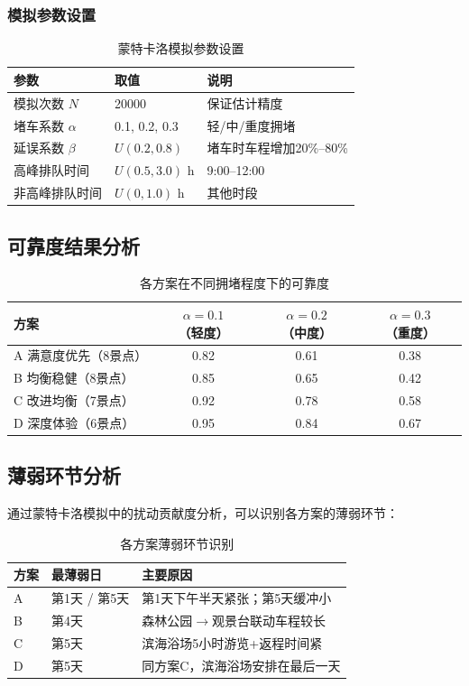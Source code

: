 \documentclass[12pt,a4paper]{ctexart}
\begin{document}
\subsubsection{模拟参数设置}

\begin{table}[H]
\centering
\caption{蒙特卡洛模拟参数设置}
\label{tab:mc_params}
\begin{tabular}{lll}
\toprule
\textbf{参数} & \textbf{取值} & \textbf{说明} \\
\midrule
模拟次数 $N$ & 20000 & 保证估计精度 \\
堵车系数 $\alpha$ & 0.1, 0.2, 0.3 & 轻/中/重度拥堵 \\
延误系数 $\beta$ & $U(0.2, 0.8)$ & 堵车时车程增加20\%--80\% \\
高峰排队时间 & $U(0.5, 3.0)$ h & 9:00--12:00 \\
非高峰排队时间 & $U(0, 1.0)$ h & 其他时段 \\
\bottomrule
\end{tabular}
\end{table}

\subsection{可靠度结果分析}

\begin{table}[H]
\centering
\caption{各方案在不同拥堵程度下的可靠度}
\label{tab:reliability}
\begin{tabular}{lccc}
\toprule
\textbf{方案} & \textbf{$\alpha=0.1$（轻度）} & \textbf{$\alpha=0.2$（中度）} & \textbf{$\alpha=0.3$（重度）} \\
\midrule
A 满意度优先（8景点） & 0.82 & 0.61 & 0.38 \\
B 均衡稳健（8景点） & 0.85 & 0.65 & 0.42 \\
C 改进均衡（7景点） & 0.92 & 0.78 & 0.58 \\
D 深度体验（6景点） & 0.95 & 0.84 & 0.67 \\
\bottomrule
\end{tabular}
\end{table}

\subsection{薄弱环节分析}

通过蒙特卡洛模拟中的扰动贡献度分析，可以识别各方案的薄弱环节：

\begin{table}[H]
\centering
\caption{各方案薄弱环节识别}
\label{tab:bottleneck}
\begin{tabular}{lp{4cm}p{4cm}}
\toprule
\textbf{方案} & \textbf{最薄弱日} & \textbf{主要原因} \\
\midrule
A & 第1天 / 第5天 & 第1天下午半天紧张；第5天缓冲小 \\
B & 第4天 & 森林公园$\to$观景台联动车程较长 \\
C & 第5天 & 滨海浴场5小时游览+返程时间紧 \\
D & 第5天 & 同方案C，滨海浴场安排在最后一天 \\
\bottomrule
\end{tabular}
\end{table}
\end{document}
